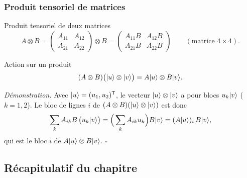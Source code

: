\subsubsection{Produit tensoriel de matrices}

\begin{definition}{Produit tensoriel de deux matrices}
\[
  A\otimes B=\begin{pmatrix}A_{11} & A_{12}\\ A_{21} & A_{22}\end{pmatrix}\otimes B
  =\begin{pmatrix}A_{11}B & A_{12}B\\ A_{21}B & A_{22}B\end{pmatrix}
  \qquad(\text{matrice }4\times4).
\]
\end{definition}

\begin{resultat}{Action sur un produit}
\[
  (A\otimes B)\big(|u\rangle\otimes|v\rangle\big)=A|u\rangle\otimes B|v\rangle.
\]
\end{resultat}

\emph{Démonstration.} Avec $|u\rangle=(u_1,u_2)^{\mathsf T}$, le vecteur $|u\rangle\otimes|v\rangle$ a
pour blocs $u_k|v\rangle$ ($k=1,2$). Le bloc de lignes $i$ de $(A\otimes B)(|u\rangle\otimes|v\rangle)$ est
donc
\[
  \sum_kA_{ik}B\,\big(u_k|v\rangle\big)=\Big(\sum_kA_{ik}u_k\Big)B|v\rangle=(A|u\rangle)_i\,B|v\rangle,
\]
qui est le bloc $i$ de $A|u\rangle\otimes B|v\rangle$. \hfill$\square$

\clearpage
\subsection{Récapitulatif du chapitre}\label{sec:recap3}

